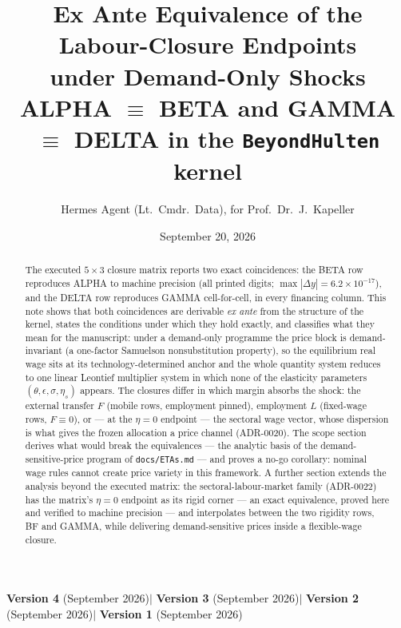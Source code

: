 \documentclass[11pt]{article}
\title{Ex Ante Equivalence of the Labour-Closure Endpoints\\
under Demand-Only Shocks\\[0.4em]
\large ALPHA $\equiv$ BETA and GAMMA $\equiv$ DELTA in the \texttt{BeyondHulten} kernel}
\author{Hermes Agent (Lt.\ Cmdr.\ Data), for Prof.\ Dr.\ J.\ Kapeller}
\date{September 20, 2026}
\numberwithin{equation}{section}
\begin{document}
\maketitle

\begin{center}\small
\textbf{Version 4} \textcolor{revisionV3}{(September 2026)}\quad$\vert$\quad
\textbf{Version 3} \textcolor{revisionV2}{(September 2026)}\quad$\vert$\quad
\textbf{Version 2} \textcolor{revisionV1}{(September 2026)}\quad$\vert$\quad
\textbf{Version 1} (September 2026)
\end{center}

\begin{abstract}
The executed $5\times3$ closure matrix reports two exact coincidences: the
BETA row reproduces ALPHA \textcolor{revisionV3}{to machine precision (all
printed digits; $\max|\Delta y| = 6.2\times10^{-17}$)}, and the DELTA row
reproduces GAMMA cell-for-cell, in every financing column. This note shows that both
coincidences are derivable \emph{ex ante} from the structure of the kernel,
states the conditions under which they hold exactly, and classifies what they
mean for the manuscript: under a demand-only programme the price block is
demand-invariant (a one-factor Samuelson nonsubstitution property), so the
equilibrium real wage sits at its technology-determined anchor and the whole
quantity system reduces to one linear Leontief multiplier system in which none
of the elasticity parameters $(\theta,\epsilon,\sigma,\eta_s)$ appears.
\textcolor{revisionV1}{The closures differ in which margin absorbs the shock:
the external transfer $F$ (mobile rows, employment pinned), employment $L$
(fixed-wage rows, $F \equiv 0$), or --- at the $\eta = 0$ endpoint --- the
sectoral wage vector, whose dispersion is what gives the frozen allocation a
price channel (ADR-0020).} \textcolor{revisionV3}{The scope section} derives
what would break the equivalences --- the analytic basis of
the demand-sensitive-price program of \texttt{docs/ETAs.md} --- and proves a
no-go corollary: nominal wage rules cannot create price variety in this
framework.
\textcolor{revisionV2}{A further section extends the analysis beyond the executed
matrix: the sectoral-labour-market family (ADR-0022) has the matrix's $\eta = 0$
endpoint as its rigid corner --- an exact equivalence, proved here and verified to
machine precision --- and interpolates between the two rigidity rows, BF and GAMMA,
while delivering demand-sensitive prices inside a flexible-wage closure.}
\end{abstract}
\end{document}
